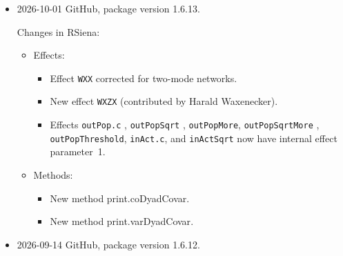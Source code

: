 \documentclass[a4paper,fleqn,11pt]{article}
\newcommand{\+}{\, + \,}
\newcommand{\sfn}[1]{\textsf{#1}}
\begin{document}
\begin{small}
\begin{itemize}
\item 2026-10-01 GitHub, package version 1.6.13.

Changes in RSiena:
\begin{itemize}
  \item  Effects:
  \begin{itemize}
  \item Effect \texttt{WXX} corrected for two-mode networks.
  \item New effect \texttt{WXZX} (contributed by Harald Waxenecker).
  \item Effects  \texttt{outPop.c} , \texttt{outPopSqrt} , \texttt{outPopMore}, \texttt{outPopSqrtMore} ,
    \texttt{outPopThreshold}, \texttt{inAct.c},  and \texttt{inActSqrt}  now have
    internal effect parameter~1.
    \end{itemize}
  \item  Methods:
     \begin{itemize}
     \item New method \sfn{print.coDyadCovar}.
     \item New method \sfn{print.varDyadCovar}.
  \end{itemize}
\end{itemize}

\item 2026-09-14 GitHub, package version 1.6.12.


\end{itemize}
\end{small}
\end{document}
